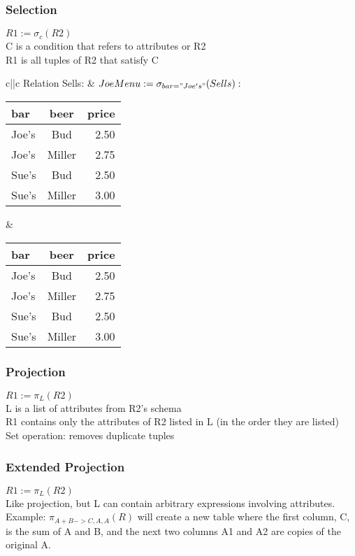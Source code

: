 \documentclass[12pt]{article}
\begin{document}
\subsubsection{Selection}
$R1:=\sigma_c (R2)$\\
C is a condition that refers to attributes or R2\\
R1 is all tuples of R2 that satisfy C\\
\begin{center}
\begin{tabular}[H]{c||c}
  Relation Sells: & $JoeMenu := \sigma_{bar="Joe's"}(Sells):$\\
\begin{tabular}[H]{l|c|r}
  bar & beer & price\\
  \hline
  Joe's & Bud & 2.50\\
  Joe's & Miller & 2.75\\
  Sue's & Bud & 2.50\\
  Sue's & Miller & 3.00\\
\end{tabular}
&
\begin{tabular}[H]{l|c|r}
  bar & beer & price\\
  \hline
  Joe's & Bud & 2.50\\
  Joe's & Miller & 2.75\\
  Sue's & Bud & 2.50\\
  Sue's & Miller & 3.00\\
\end{tabular}
\end{tabular}
\end{center}


\subsubsection{Projection}
$R1 := \pi_L(R2)$\\
L is a list of attributes from R2's schema\\
R1 contains only the attributes of R2 listed in L (in the order they are
listed)\\
Set operation: removes duplicate tuples\\

\subsubsection{Extended Projection}
$R1 := \pi_L(R2)$\\
Like projection, but L can contain arbitrary expressions involving attributes.
Example: $\pi_{A+B->C,A,A}(R)$ will create a new table where the first column,
C, is the sum of A and B, and the next two columns A1 and A2 are copies of the
original A.
\end{document}
